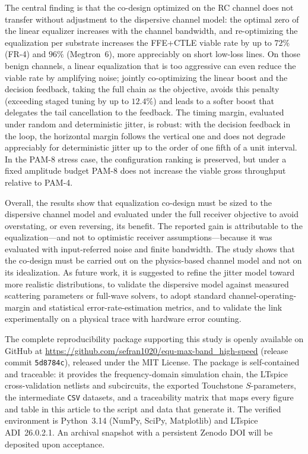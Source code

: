 \documentclass[twocolumn]{USG}
\begin{document}
The central finding is that the co-design optimized on the RC channel does
not transfer without adjustment to the dispersive channel model: the optimal zero of
the linear equalizer increases with the channel bandwidth, and re-optimizing
the equalization per substrate increases the FFE+CTLE viable rate by up to
$72\%$ (FR-4) and $96\%$ (Megtron~6), more appreciably on short low-loss
lines. On
those benign channels, a linear equalization that is too aggressive can even
reduce the viable rate by amplifying noise; jointly co-optimizing the linear
boost and the decision feedback, taking the full chain as the objective,
avoids this penalty (exceeding staged tuning by up to $12.4\%$) and leads to
a softer boost that delegates the tail cancellation to the feedback. The
timing margin, evaluated under random and deterministic jitter, is robust:
with the decision feedback in the loop, the horizontal margin follows the
vertical one and does not degrade appreciably for deterministic jitter up to
the order of one fifth of a unit interval. In the PAM-8 stress case, the
configuration ranking is preserved, but under a fixed amplitude budget PAM-8
does not increase the viable gross throughput relative to PAM-4.

Overall, the results show that equalization co-design must be sized to the
dispersive channel model and evaluated under the full receiver objective to avoid
overstating, or even reversing, its benefit. The reported gain is attributable
to the equalization---and not to optimistic receiver assumptions---because it
was evaluated with input-referred noise and finite bandwidth. The study shows
that the co-design must be carried out on the physics-based channel model and not on its
idealization. As future work, it is suggested to refine the jitter model
toward more realistic distributions, to validate the dispersive model against
measured scattering parameters or full-wave solvers, to adopt standard
channel-operating-margin and statistical error-rate-estimation metrics, and
to validate the link experimentally on a physical trace with hardware error
counting.

The complete reproducibility package supporting this study is openly
available on GitHub at
\url{https://github.com/sefran1020/equ-max-band_high-speed} (release commit
\texttt{5d8784c}), released under the MIT License. The package is
self-contained and traceable: it provides the frequency-domain simulation
chain, the LTspice cross-validation netlists and subcircuits, the exported
Touchstone $S$-parameters, the intermediate \texttt{CSV} datasets, and a
traceability matrix that maps every figure and table in this article to the
script and data that generate it. The verified environment is Python~3.14
(NumPy, SciPy, Matplotlib) and LTspice ADI~26.0.2.1. An archival snapshot
with a persistent Zenodo DOI will be deposited upon acceptance.
\end{document}
